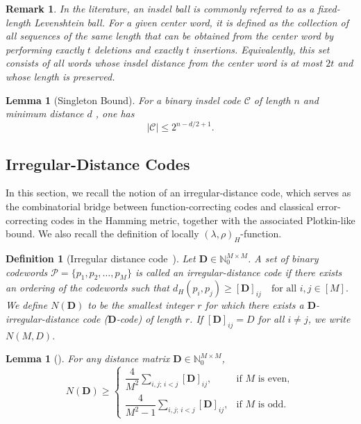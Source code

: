 \documentclass[11 pt]{article}
\numberwithin{equation}{section}
\newtheorem{lemma}[theorem]{Lemma}
\newtheorem{definition}[theorem]{Definition}
\newtheorem{remark}[theorem]{Remark}
\begin{document}
   
    \begin{remark}
        In the literature, an insdel ball is commonly referred to as a fixed-length Levenshtein ball. For a given center word, it is defined as the collection of all sequences of the same length that can be obtained from the center word by performing exactly $t$ deletions and exactly $t$ insertions. Equivalently, this set consists of all words whose insdel distance from the center word is at most $2t$ and whose length is preserved.
    \end{remark}
    
    \begin{lemma}[Singleton Bound]\cite{liu2022bounds}\label{singleton}
        For a binary insdel code $\mathcal{C}$ of length $n$ and minimum distance $d$ , one has
        \[
            |\mathcal{C}| \leq 2^{n - d/2 + 1}.
        \]
    \end{lemma}
    

 \subsection{Irregular-Distance Codes}
    In this section, we recall the notion of an irregular-distance code, which serves as the combinatorial bridge between function-correcting codes and classical error-correcting codes in the Hamming metric, together with the associated Plotkin-like bound. We also recall the definition of locally $(\lambda, \rho)_H$-function.
    
    \begin{definition}[Irregular distance code~\cite{10132545}]
    \label{def:irr-dis-code}
        Let $\textbf{D} \in \mathbb{N}_0^{M \times M}$. A set of binary codewords $\mathcal{P} = \{p_1, p_2, \ldots, p_M\}$ is called an irregular-distance code if there exists an ordering of the codewords such that $d_H(p_i, p_j) \ge [\textbf{D}]_{ij} \quad \text{for all } i,j \in [M].$ We define $N(\textbf{D})$ to be the smallest integer $r$ for which there exists a $\textbf{D}$-irregular-distance code ($\textbf{D}$-code) of length $r$.  
        If $[\textbf{D}]_{ij} = D$ for all $i \neq j$, we write $N(M, D).$
    \end{definition}

    
    \begin{lemma}[\cite{10132545}]\label{plotkin_FCC}
        For any distance matrix $\textbf{D} \in \mathbb{N}_0^{M \times M}$,
        \[
        N(\textbf{D}) \ge
        \begin{cases}
        \dfrac{4}{M^2} \displaystyle\sum_{i,j; \, i<j} [\textbf{D}]_{ij}, & \text{if $M$ is even}, \\[1.2em]
        \dfrac{4}{M^2 - 1} \displaystyle\sum_{i,j; \, i<j} [\textbf{D}]_{ij}, & \text{if $M$ is odd}.
        \end{cases}
        \]
    \end{lemma}
\end{document}
